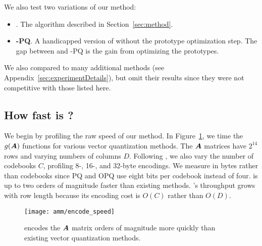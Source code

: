 We also test two variations of our method:
\vspace{-3mm}
\begin{itemize}\itemsep-.5mm
    \item \textbf{\ours}. The algorithm described in Section~\ref{sec:method}.
    \item \textbf{\ours-PQ}. A handicapped version of \oursp without the prototype optimization step. The gap between \oursp and \ours-PQ is the gain from optimizing the prototypes.
\end{itemize}
\vspace{-3mm}
We also compared to many additional methods (see Appendix~\ref{sec:experimentDetails}), but omit their results since they were not competitive with those listed here.

\vspace{-1mm}
\subsection{How fast is \ours?}
\vspace{-.5mm}

We begin by profiling the raw speed of our method. In Figure~\ref{fig:encodeSpeed}, we time the $g(\bm{A})$ functions for various vector quantization methods. The $\bm{A}$ matrices have $2^{14}$ rows and varying numbers of columns $D$. Following \cite{bolt}, we also vary the number of codebooks $C$, profiling 8-, 16-, and 32-byte encodings. We measure in bytes rather than codebooks since PQ and OPQ use eight bits per codebook instead of four. \oursp is up to two orders of magnitude faster than existing methods. \ours's throughput grows with row length because its encoding cost is $O(C)$ rather than $O(D)$.
\begin{figure}[h]
\begin{center}
\texttt{[image: amm/encode\_speed]}
\caption{\oursp encodes the $\bm{A}$ matrix orders of magnitude more quickly than existing vector quantization methods.}
\label{fig:encodeSpeed}
\end{center}
\end{figure}

